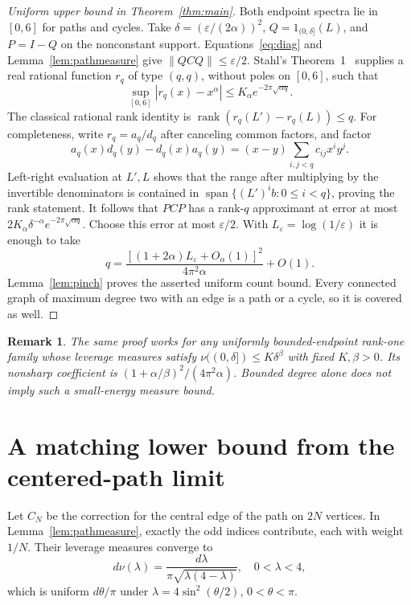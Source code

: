 \documentclass[11pt]{article}
\newtheorem{remark}[theorem]{Remark}
\newcommand{\rank}{\operatorname{rank}}
\begin{document}
\begin{proof}[Uniform upper bound in Theorem~\ref{thm:main}]
Both endpoint spectra lie in $[0,6]$ for paths and cycles. Take
$\delta=(\varepsilon/(2\alpha))^2$,
$Q=1_{(0,\delta]}(L)$, and $P=I-Q$ on the nonconstant support.
Equations~\eqref{eq:diag} and Lemma~\ref{lem:pathmeasure} give
$\|QCQ\|\le\varepsilon/2$.
Stahl's Theorem~1~\cite{Stahl} supplies a real rational function $r_q$
of type $(q,q)$, without poles on $[0,6]$, such that
\[
 \sup_{[0,6]}|r_q(x)-x^\alpha|
                         \le K_\alpha e^{-2\pi\sqrt{\alpha q}}.
\]
The classical rational rank identity is
$\rank(r_q(L')-r_q(L))\le q$.
For completeness, write $r_q=a_q/d_q$ after canceling common factors,
and factor
\[
 a_q(x)d_q(y)-d_q(x)a_q(y)
           =(x-y)\sum_{i,j<q}c_{ij}x^iy^j.
\]
Left-right evaluation at $L',L$ shows that the range after multiplying
by the invertible denominators is contained in
$\operatorname{span}\{(L')^ib:0\le i<q\}$, proving the rank statement.
It follows that $PCP$ has a rank-$q$ approximant at error at most
$2K_\alpha\delta^{-\alpha}e^{-2\pi\sqrt{\alpha q}}$.
Choose this error at most $\varepsilon/2$. With
$L_\varepsilon=\log(1/\varepsilon)$ it is enough to take
\[
 q=\frac{[(1+2\alpha)L_\varepsilon+O_\alpha(1)]^2}{4\pi^2\alpha}+O(1).
\]
Lemma~\ref{lem:pinch} proves the asserted uniform count bound.
Every connected graph of maximum degree two with an edge is a path or
a cycle, so it is covered as well.
\end{proof}

\begin{remark}
The same proof works for any uniformly bounded-endpoint rank-one family
whose leverage measures satisfy $\nu((0,\delta])\le K\delta^\beta$
with fixed $K,\beta>0$. Its nonsharp coefficient is
$(1+\alpha/\beta)^2/(4\pi^2\alpha)$. Bounded degree alone does not
imply such a small-energy measure bound.
\end{remark}

\section{A matching lower bound from the centered-path limit}
Let $C_N$ be the correction for the central edge of the path on $2N$
vertices. In Lemma~\ref{lem:pathmeasure}, exactly the odd indices
contribute, each with weight $1/N$. Their leverage measures converge to
\begin{equation}\label{eq:arcsine}
 d\nu(\lambda)=\frac{d\lambda}{\pi\sqrt{\lambda(4-\lambda)}},\quad
 0<\lambda<4,
\end{equation}
which is uniform $d\theta/\pi$ under
$\lambda=4\sin^2(\theta/2)$, $0<\theta<\pi$.
\end{document}
